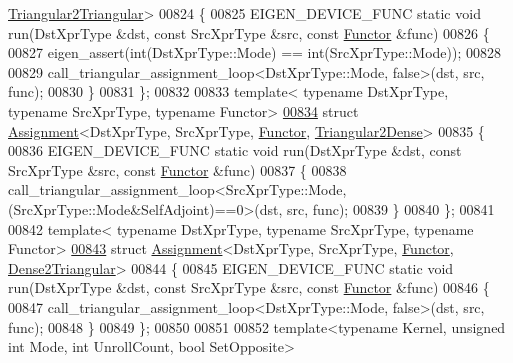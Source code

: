 \begin{DoxyCode}
      \hyperlink{struct_eigen_1_1internal_1_1_triangular2_triangular}{Triangular2Triangular}>
00824 \{
00825   EIGEN\_DEVICE\_FUNC \textcolor{keyword}{static} \textcolor{keywordtype}{void} run(DstXprType &dst, \textcolor{keyword}{const} SrcXprType &src, \textcolor{keyword}{const} 
      \hyperlink{struct_functor}{Functor} &func)
00826   \{
00827     eigen\_assert(\textcolor{keywordtype}{int}(DstXprType::Mode) == \textcolor{keywordtype}{int}(SrcXprType::Mode));
00828     
00829     call\_triangular\_assignment\_loop<DstXprType::Mode, false>(dst, src, func);  
00830   \}
00831 \};
00832 
00833 \textcolor{keyword}{template}< \textcolor{keyword}{typename} DstXprType, \textcolor{keyword}{typename} SrcXprType, \textcolor{keyword}{typename} Functor>
\hyperlink{struct_eigen_1_1internal_1_1_assignment_3_01_dst_xpr_type_00_01_src_xpr_type_00_01_functor_00_01_triangular2_dense_01_4}{00834} \textcolor{keyword}{struct }\hyperlink{struct_eigen_1_1internal_1_1_assignment}{Assignment}<DstXprType, SrcXprType, \hyperlink{struct_functor}{Functor}, 
      \hyperlink{struct_eigen_1_1internal_1_1_triangular2_dense}{Triangular2Dense}>
00835 \{
00836   EIGEN\_DEVICE\_FUNC \textcolor{keyword}{static} \textcolor{keywordtype}{void} run(DstXprType &dst, \textcolor{keyword}{const} SrcXprType &src, \textcolor{keyword}{const} 
      \hyperlink{struct_functor}{Functor} &func)
00837   \{
00838     call\_triangular\_assignment\_loop<SrcXprType::Mode, (SrcXprType::Mode&SelfAdjoint)==0>(dst, src, func);  
00839   \}
00840 \};
00841 
00842 \textcolor{keyword}{template}< \textcolor{keyword}{typename} DstXprType, \textcolor{keyword}{typename} SrcXprType, \textcolor{keyword}{typename} Functor>
\hyperlink{struct_eigen_1_1internal_1_1_assignment_3_01_dst_xpr_type_00_01_src_xpr_type_00_01_functor_00_01_dense2_triangular_01_4}{00843} \textcolor{keyword}{struct }\hyperlink{struct_eigen_1_1internal_1_1_assignment}{Assignment}<DstXprType, SrcXprType, \hyperlink{struct_functor}{Functor}, 
      \hyperlink{struct_eigen_1_1internal_1_1_dense2_triangular}{Dense2Triangular}>
00844 \{
00845   EIGEN\_DEVICE\_FUNC \textcolor{keyword}{static} \textcolor{keywordtype}{void} run(DstXprType &dst, \textcolor{keyword}{const} SrcXprType &src, \textcolor{keyword}{const} 
      \hyperlink{struct_functor}{Functor} &func)
00846   \{
00847     call\_triangular\_assignment\_loop<DstXprType::Mode, false>(dst, src, func);  
00848   \}
00849 \};
00850 
00851 
00852 \textcolor{keyword}{template}<\textcolor{keyword}{typename} Kernel, \textcolor{keywordtype}{unsigned} \textcolor{keywordtype}{int} Mode, \textcolor{keywordtype}{int} UnrollCount, \textcolor{keywordtype}{bool} SetOpposite>

\end{DoxyCode}
